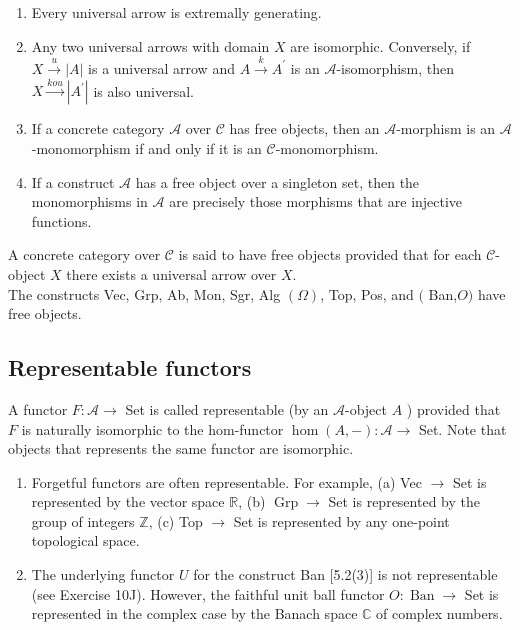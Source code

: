 \begin{prop}
    \begin{enumerate}
        \item Every universal arrow is extremally generating.
        \item Any two universal arrows with domain $X$ are isomorphic. Conversely, if $X \xrightarrow{u}|A|$ is a universal arrow and $A \xrightarrow{k} A^{\prime}$ is an $\mathcal{A}$-isomorphism, then $X \xrightarrow{k o u}\left|A^{\prime}\right|$ is also universal.
        \item If a concrete category $\mathcal{A}$ over $\mathcal{C}$ has free objects, then an $\mathcal{A}$-morphism is an $\mathcal{A}$-monomorphism if and only if it is an $\mathcal{C}$-monomorphism.
        \item If a construct $\mathcal{A}$ has a free object over a singleton set, then the monomorphisms in $\mathcal{A}$ are precisely those morphisms that are injective functions.
    \end{enumerate}
\end{prop}

A concrete category over $\mathcal{C}$ is said to have free objects provided that for each $\mathcal{C}$-object $X$ there exists a universal arrow over $X$.\\
The constructs Vec, Grp, Ab, Mon, Sgr, Alg $(\Omega)$, Top, Pos, and $($ Ban,$O)$ have free objects.


\subsection*{Representable functors}
A functor $F: \mathcal{A} \rightarrow$ Set is called representable (by an $\mathcal{A}$-object $A$ ) provided that $F$ is naturally isomorphic to the hom-functor $\operatorname{hom}(A,-): \mathcal{A} \rightarrow$ Set. Note that objects that represents the same functor are isomorphic.

\begin{example}
    \begin{enumerate}
        \item Forgetful functors are often representable. For example,
        (a) Vec $\rightarrow$ Set is represented by the vector space $\mathbb{R}$,
        (b) $\operatorname{Grp} \rightarrow$ Set is represented by the group of integers $\mathbb{Z}$,
        (c) Top $\rightarrow$ Set is represented by any one-point topological space.
        \item The underlying functor $U$ for the construct Ban [5.2(3)] is not representable (see Exercise 10J). However, the faithful unit ball functor $O: \operatorname{Ban} \rightarrow$ Set is represented in the complex case by the Banach space $\mathbb{C}$ of complex numbers.
    \end{enumerate}
\end{example}

